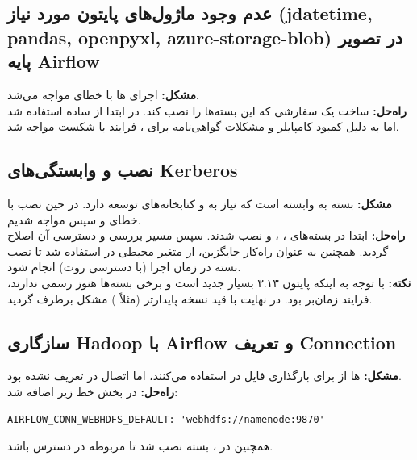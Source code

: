 \documentclass[12pt,a4paper]{article}
\begin{document}
\subsection{عدم وجود ماژول‌های پایتون مورد نیاز (jdatetime, pandas, openpyxl, azure-storage-blob) در تصویر پایه Airflow}
\textbf{مشکل:} اجرای ها با خطای  مواجه می‌شد. \\
\textbf{راه‌حل:} ساخت یک  سفارشی که این بسته‌ها را نصب کند. در ابتدا از  ساده استفاده شد اما به دلیل کمبود کامپایلر  و مشکلات گواهی‌نامه  برای ، فرایند  با شکست مواجه شد.

\subsection{نصب  و وابستگی‌های Kerberos}
\textbf{مشکل:} بسته  به  وابسته است که نیاز به  و کتابخانه‌های توسعه  دارد. در حین نصب با خطای  و سپس  مواجه شدیم. \\
\textbf{راه‌حل:} ابتدا در  بسته‌های ، ،  و  نصب شدند. سپس مسیر  بررسی و دسترسی آن اصلاح گردید. همچنین به عنوان راه‌کار جایگزین، از متغیر محیطی  در  استفاده شد تا نصب بسته در زمان اجرا (با دسترسی روت) انجام شود. \\
\textbf{نکته:} با توجه به اینکه پایتون ۳.۱۳ بسیار جدید است و برخی بسته‌ها هنوز  رسمی ندارند، فرایند  زمان‌بر بود. در نهایت با قید نسخه پایدارتر  (مثلاً ) مشکل برطرف گردید.

\subsection{سازگاری Hadoop با Airflow و تعریف Connection}
\textbf{مشکل:} ها از  برای بارگذاری فایل در  استفاده می‌کنند، اما اتصال  در  تعریف نشده بود. \\
\textbf{راه‌حل:} در بخش  خط زیر اضافه شد:
\begin{latin}
\begin{verbatim}
AIRFLOW_CONN_WEBHDFS_DEFAULT: 'webhdfs://namenode:9870'
\end{verbatim}
\end{latin}
همچنین در ، بسته  نصب شد تا  مربوطه در دسترس باشد.
\end{document}
